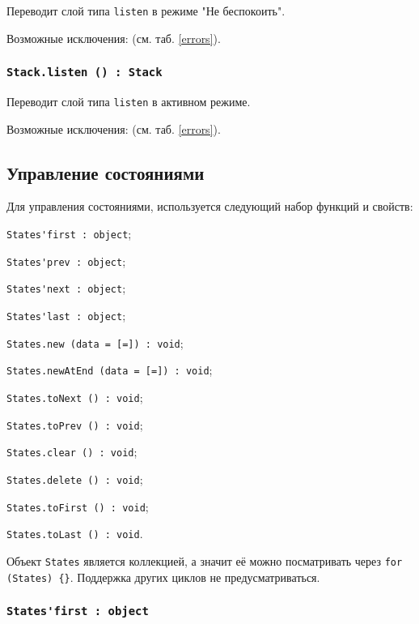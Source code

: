 Переводит слой типа \lstinline|listen| в режиме "Не беспокоить".

Возможные исключения:  (см. таб. \ref{errors}).

\subsubsection{\lstinline|Stack.listen () : Stack|}

Переводит слой типа \lstinline|listen| в активном режиме.

Возможные исключения:  (см. таб. \ref{errors}).

\subsection{Управление состояниями}

Для управления состояниями, используется следующий набор функций и свойств:
\begin{icItems}
	\item \lstinline|States'first : object|;
	\item \lstinline|States'prev : object|;
	\item \lstinline|States'next : object|;
	\item \lstinline|States'last : object|;
	\item \lstinline|States.new (data = [=]) : void|;
	\item \lstinline|States.newAtEnd (data = [=]) : void|;
	\item \lstinline|States.toNext () : void|;
	\item \lstinline|States.toPrev () : void|;
	\item \lstinline|States.clear () : void|;
	\item \lstinline|States.delete () : void|;
	\item \lstinline|States.toFirst () : void|;
	\item \lstinline|States.toLast () : void|.
\end{icItems}

Объект \lstinline|States| является коллекцией, а значит её можно посматривать через \lstinline|for (States) {}|. Поддержка других циклов не предусматриваться.

\subsubsection{\lstinline|States'first : object|}

